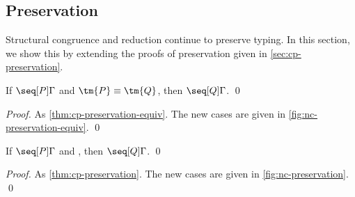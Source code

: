 \documentclass[UKenglish]{llncs}
\begin{document}
\subsection{Preservation}
\label{sec:nc-preservation}
Structural congruence and reduction continue to preserve typing. In this
section, we show this by extending the proofs of preservation given in
\cref{sec:cp-preservation}.
\begin{theorem}\label{thm:nc-preservation-equiv}
  If $\seq[{ P }]{ \Gamma }$ and $\tm{P} \equiv \tm{Q}$,
  then $\seq[{ Q }]{\Gamma }$.
  \qed
\end{theorem}
\begin{proof}
  As \cref{thm:cp-preservation-equiv}.
  The new cases are given in \cref{fig:nc-preservation-equiv}.
  \qed
\end{proof}

\begin{theorem}[Preservation]\label{thm:nc-preservation}
  If $\seq[{ P }]{ \Gamma }$ and ,
  then $\seq[{ Q }]{ \Gamma }$.
  \qed
\end{theorem}
\begin{proof}
  As \cref{thm:cp-preservation}.
  The new cases are given in \cref{fig:nc-preservation}.
  \qed
\end{proof}

\end{document}
